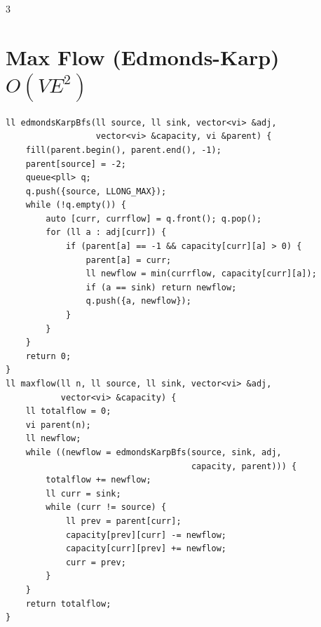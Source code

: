 \documentclass[10pt]{article}
\begin{document}
\begin{multicols*}{3}
\section{Max Flow (Edmonds-Karp) $O(VE^2)$}
\begin{lstlisting}
ll edmondsKarpBfs(ll source, ll sink, vector<vi> &adj,
                  vector<vi> &capacity, vi &parent) {
    fill(parent.begin(), parent.end(), -1);
    parent[source] = -2;
    queue<pll> q;
    q.push({source, LLONG_MAX});
    while (!q.empty()) {
        auto [curr, currflow] = q.front(); q.pop();
        for (ll a : adj[curr]) {
            if (parent[a] == -1 && capacity[curr][a] > 0) {
                parent[a] = curr;
                ll newflow = min(currflow, capacity[curr][a]);
                if (a == sink) return newflow;
                q.push({a, newflow});
            }
        }
    }
    return 0;
}
ll maxflow(ll n, ll source, ll sink, vector<vi> &adj,
           vector<vi> &capacity) {
    ll totalflow = 0;
    vi parent(n);
    ll newflow;
    while ((newflow = edmondsKarpBfs(source, sink, adj,
                                     capacity, parent))) {
        totalflow += newflow;
        ll curr = sink;
        while (curr != source) {
            ll prev = parent[curr];
            capacity[prev][curr] -= newflow;
            capacity[curr][prev] += newflow;
            curr = prev;
        }
    }
    return totalflow;
}
\end{lstlisting}


\end{multicols*}
\end{document}
